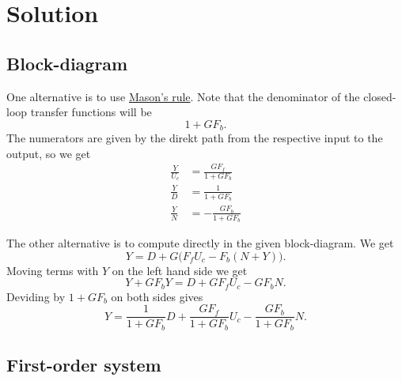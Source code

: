 \documentclass{scrartcl}
\begin{document}
\section{Solution}
\label{sec-2}
\subsection{Block-diagram}
\label{sec-2-1}

   One alternative is to use \href{https://en.wikipedia.org/wiki/Mason%2527s_gain_formula}{Mason's rule}. Note that the denominator of the closed-loop transfer functions will be
   \[ 1 + GF_b. \] The numerators are given by the direkt path from the respective input to the output, so we get
   \begin{align*}
   \frac{Y}{U_c} &= \frac{GF_f}{1+GF_b}\\
   \frac{Y}{D} &= \frac{1}{1+GF_b}\\
   \frac{Y}{N} &= -\frac{GF_b}{1+GF_b}
   \end{align*}

   The other alternative is to compute directly in the given block-diagram. We get
   \[ Y = D + G\big(F_fU_c - F_b(N+Y)\big). \]
   Moving terms with $Y$ on the left hand side we get
   \[ Y+GF_bY = D + GF_fU_c - GF_bN. \]
   Deviding by \(1+GF_b\) on both sides gives
   \[ Y = \frac{1}{1+GF_b}D + \frac{GF_f}{1+GF_b}U_c - \frac{GF_b}{1+GF_b}N. \]
\subsection{First-order system}
\label{sec-2-2}
\end{document}
